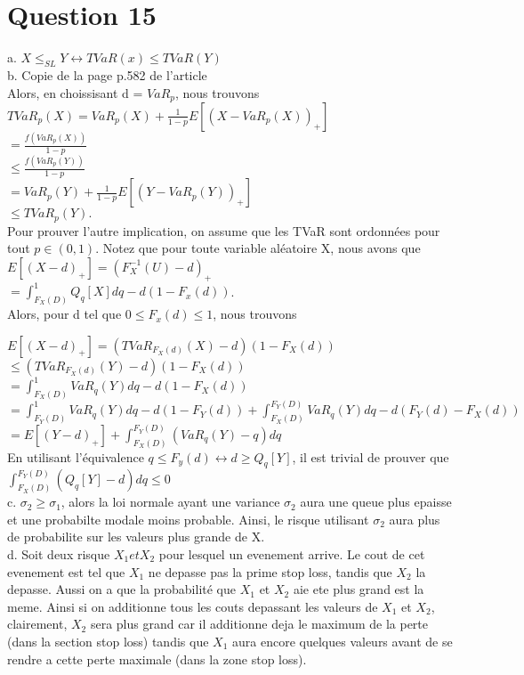 \section{Question 15}
a. $X \leq_{SL} Y \leftrightarrow TVaR(x) \leq TVaR(Y)$\\

b. Copie de la page p.582 de l'article\\

Alors, en choissisant d = $VaR_p$, nous trouvons\\

$TVaR_p(X) = VaR_p(X) + \frac{1}{1-p}E[(X-VaR_p(X))_+]$ \\
$= \frac{f(VaR_p(X))}{1-p}$ \\
$\leq \frac{f(VaR_p(Y))}{1-p}$ \\
$= VaR_p(Y) + \frac{1}{1-p}E[(Y-VaR_p(Y))_+]$ \\
$\leq TVaR_p(Y).$\\


Pour prouver l'autre implication, on assume que les TVaR sont ordonnées pour tout $p \in (0,1)$. Notez que pour toute variable aléatoire X, nous avons que\\

$E[(X-d)_+] = (F^{-1}_X(U) - d)_+ $\\
$ = \int_{F_X(D)}^{1} Q_q[X]dq-d(1-F_x(d))$.\\


Alors, pour d tel que $ 0 \le F_x(d) \le 1$, nous trouvons

$E[(X-d)_+] = (TVaR_{F_X(d)}(X) - d)(1-F_X(d)) $\\
$\leq (TVaR_{F_X(d)}(Y) - d)(1-F_X(d)) $\\
$= \int_{F_X(D)}^{1} VaR_q(Y) dq - d(1-F_X(d))$\\
$ = \int_{F_Y(D)}^{1} VaR_q(Y) dq - d(1-F_Y(d)) +
\int_{F_X(D)}^{F_Y(D)} VaR_q(Y) dq - d(F_Y(d) - F_X(d))$ \\
$= E[(Y-d)_+] + \int_{F_X(D)}^{F_Y(D)} (VaR_q(Y)-q) dq$\\


En utilisant l'équivalence $q \le F_y(d) \leftrightarrow d \geq Q_q[Y]$, il est trivial de prouver que \\

$\int_{F_X(D)}^{F_Y(D)} (Q_q[Y] - d) dq \le 0$\\


c. $\sigma_2 \geq \sigma_1$, alors la loi normale ayant une variance $\sigma_2$ aura une queue plus epaisse et une probabilte modale moins probable. Ainsi, le risque utilisant $\sigma_2$ aura plus de probabilite sur les valeurs plus grande de X.\\

d. Soit deux risque $X_1 et X_2$ pour lesquel un evenement arrive. Le cout de cet evenement est tel que $X_1$ ne depasse pas la prime stop loss, tandis  que $X_2$ la depasse. Aussi on a que la probabilité que $X_1$ et $X_2$ aie ete plus grand est la meme. Ainsi si on additionne tous les couts depassant les valeurs de $X_1$ et $X_2$, clairement, $X_2$ sera plus grand car il additionne deja le maximum de la perte (dans la section stop loss) tandis que $X_1$ aura encore quelques valeurs avant de se rendre a cette perte maximale (dans la zone stop loss).\\